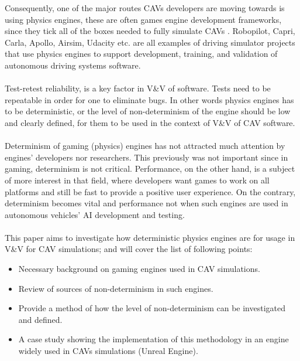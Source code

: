 Consequently, one of the major routes CAVs developers are moving towards is using physics engines, these are often games engine development frameworks, since they tick all of the boxes needed to fully simulate CAVs \cite{FrameworkAndChallenges}.  
Robopilot, Capri, Carla, Apollo, Airsim, Udacity etc. are all examples of driving simulator projects that use physics engines to support development, training, and validation of autonomous driving systems software\cite{ListOfSimulators}. \\\\
Test-retest reliability, is a key factor in V\&V of software. Tests need to be repeatable in order for one to eliminate bugs. 
In other words physics engines has to be deterministic, or the level of non-determinism of the engine should be low and clearly defined, for them to be used in the context of V\&V of CAV software.\\\\
 Determinism of gaming (physics) engines has not attracted much attention by engines' developers nor researchers. This previously was not important since in gaming, determinism is not critical. 
Performance, on the other hand, is a subject of more interest in that field, where developers want games to work on all platforms and still be fast to provide a positive user experience. 
On the contrary, determinism becomes vital and performance not when such engines are used in autonomous vehicles' AI development and testing. \\\\
This paper aims to investigate how deterministic physics engines are for usage in V\&V for CAV simulations; and will cover the list of following points:
\begin{itemize}[leftmargin=*]
    \item Necessary background on gaming engines used in CAV simulations.
    \item Review of sources of non-determinism in such engines.
    \item Provide a method of how the level of non-determinism can be investigated and defined.
    \item A case study showing the implementation of this methodology in an engine widely used in CAVs simulations (Unreal Engine).
\end{itemize}
 
 



